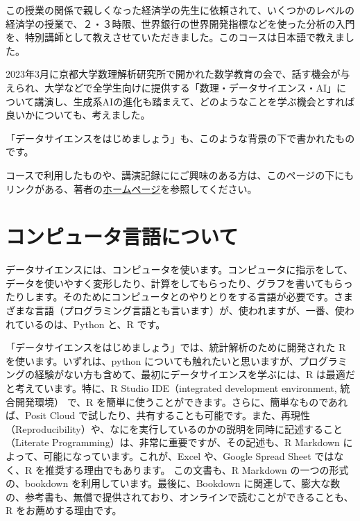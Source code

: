 \documentclass[
  xelatex, ja=standard]{bxjsbook}
\theoremstyle{definition}
\theoremstyle{definition}
\theoremstyle{definition}
\theoremstyle{definition}
\theoremstyle{remark}
\begin{document}
この授業の関係で親しくなった経済学の先生に依頼されて、いくつかのレベルの経済学の授業で、２・３時限、世界銀行の世界開発指標などを使った分析の入門を、特別講師として教えさせていただきました。このコースは日本語で教えました。

2023年3月に京都大学数理解析研究所で開かれた数学教育の会で、話す機会が与えられ、大学などで全学生向けに提供する「数理・データサイエンス・AI」について講演し、生成系AIの進化も踏まえて、どのようなことを学ぶ機会とすれば良いかについても、考えました。

「データサイエンスをはじめましょう」も、このような背景の下で書かれたものです。

コースで利用したものや、講演記録ににご興味のある方は、このページの下にもリンクがある、著者の\href{https://icu-hsuzuki.github.io/science/computer/learning/ds.html}{ホームページ}を参照してください。

\hypertarget{ux30b3ux30f3ux30d4ux30e5ux30fcux30bfux8a00ux8a9eux306bux3064ux3044ux3066}{%
\section*{コンピュータ言語について}\label{ux30b3ux30f3ux30d4ux30e5ux30fcux30bfux8a00ux8a9eux306bux3064ux3044ux3066}}

データサイエンスには、コンピュータを使います。コンピュータに指示をして、データを使いやすく変形したり、計算をしてもらったり、グラフを書いてもらったりします。そのためにコンピュータとのやりとりをする言語が必要です。さまざまな言語（プログラミング言語とも言います）が、使われますが、一番、使われているのは、Python と、R です。

「データサイエンスをはじめましょう」では、統計解析のために開発された R を使います。いずれは、python についても触れたいと思いますが、プログラミングの経験がない方も含めて、最初にデータサイエンスを学ぶには、R は最適だと考えています。特に、R Studio IDE（integrated development environment, 統合開発環境） で、R を簡単に使うことができます。さらに、簡単なものであれば、Posit Cloud で試したり、共有することも可能です。また、再現性（Reproducibility）や、なにを実行しているのかの説明を同時に記述すること（Literate Programming）は、非常に重要ですが、その記述も、R Markdown によって、可能になっています。これが、Excel や、Google Spread Sheet ではなく、R を推奨する理由でもあります。 この文書も、R Markdown の一つの形式の、bookdown を利用しています。最後に、Bookdown に関連して、膨大な数の、参考書も、無償で提供されており、オンラインで読むことができることも、R をお薦めする理由です。
\end{document}
